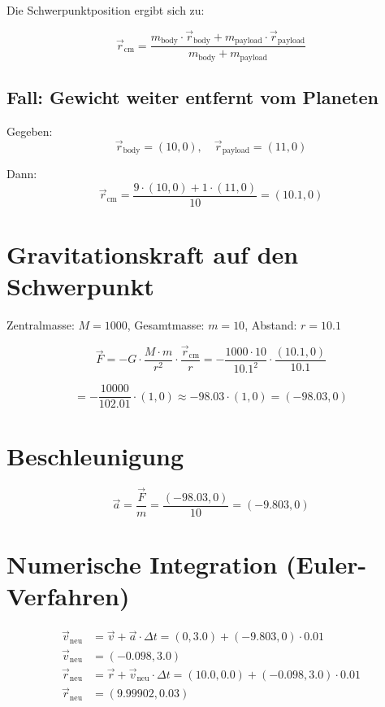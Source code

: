 \documentclass[conference]{IEEEtran}
\begin{document}
Die Schwerpunktposition ergibt sich zu:

\[
\vec{r}_\text{cm} = \frac{m_\text{body} \cdot \vec{r}_\text{body} + m_\text{payload} \cdot \vec{r}_\text{payload}}{m_\text{body} + m_\text{payload}}
\]

\subsection*{Fall: Gewicht weiter entfernt vom Planeten}

Gegeben:
\[
\vec{r}_\text{body} = (10, 0), \quad \vec{r}_\text{payload} = (11, 0)
\]

Dann:
\[
\vec{r}_\text{cm} = \frac{9 \cdot (10, 0) + 1 \cdot (11, 0)}{10} = (10.1, 0)
\]

\section{Gravitationskraft auf den Schwerpunkt}

Zentralmasse: \( M = 1000 \), Gesamtmasse: \( m = 10 \), Abstand: \( r = 10.1 \)

\[
\vec{F} = - G \cdot \frac{M \cdot m}{r^2} \cdot \frac{\vec{r}_\text{cm}}{r}
= - \frac{1000 \cdot 10}{10.1^2} \cdot \frac{(10.1, 0)}{10.1}
\]

\[
= - \frac{10000}{102.01} \cdot (1, 0) \approx -98.03 \cdot (1, 0) = (-98.03, 0)
\]

\section{Beschleunigung}

\[
\vec{a} = \frac{\vec{F}}{m} = \frac{(-98.03, 0)}{10} = (-9.803, 0)
\]

\section{Numerische Integration (Euler-Verfahren)}

\begin{align*}
\vec{v}_\text{neu} &= \vec{v} + \vec{a} \cdot \Delta t = (0, 3.0) + (-9.803, 0) \cdot 0.01  \\
\vec{v}_\text{neu} &= (-0.098, 3.0) \\
\vec{r}_\text{neu} &= \vec{r} + \vec{v}_\text{neu} \cdot \Delta t = (10.0, 0.0) + (-0.098, 3.0) \cdot 0.01 \\
\vec{r}_\text{neu} &=(9.99902, 0.03)
\end{align*}
\end{document}
